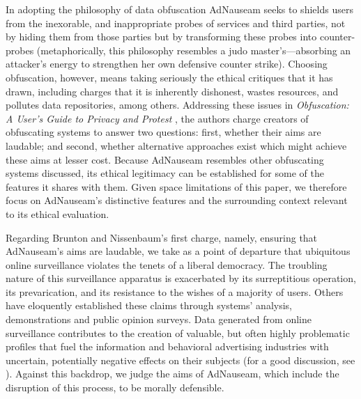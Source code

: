 \documentclass[conference]{IEEEtran}
\begin{document}
In adopting the philosophy of data obfuscation AdNauseam seeks to shields users from the inexorable, and inappropriate probes of services and third parties, not by hiding them from those parties but by transforming these probes into counter-probes (metaphorically, this philosophy resembles a judo master's---absorbing an attacker's energy to strengthen her own defensive counter strike). Choosing obfuscation, however, means taking seriously the ethical critiques that it has drawn, including charges that it is inherently dishonest, wastes resources, and pollutes data repositories, among others. Addressing these issues in \emph{Obfuscation: A User's Guide to Privacy and Protest} \cite{Brunton}, the authors charge creators of obfuscating systems to answer two questions: first, whether their aims are laudable; and second, whether alternative approaches exist which might achieve these aims at lesser cost. Because AdNauseam resembles other obfuscating systems discussed, its ethical legitimacy can be established for some of the features it shares with them. Given space limitations of this paper, we therefore focus on AdNauseam's distinctive features and the surrounding context relevant to its ethical evaluation.

Regarding Brunton and Nissenbaum's first charge, namely, ensuring that AdNauseam's aims are laudable, we take as a point of departure that ubiquitous online surveillance violates the tenets of a liberal democracy. The troubling nature of this surveillance apparatus is exacerbated by its surreptitious operation, its prevarication, and its resistance to the wishes of a majority of users. Others have eloquently established these claims through systems' analysis, demonstrations and public opinion surveys. \cite{Turow, Goldfarb, Malheiros, Tsai, Tucker} Data generated from online surveillance contributes to the creation of valuable, but often highly problematic profiles that fuel the information and behavioral advertising industries with uncertain, potentially negative effects on their subjects (for a good discussion, see \cite{Pasquale}). Against this backdrop, we judge the aims of AdNauseam, which include the disruption of this process, to be morally defensible.
\end{document}
